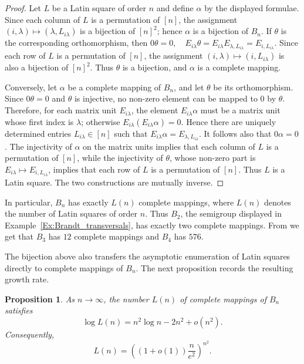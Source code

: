 \documentclass[11pt]{article}
\theoremstyle{plain}
\newtheorem{prop}[theorem]{Proposition}
\theoremstyle{remark}
\theoremstyle{definition}
\theoremstyle{plain}
\begin{document}
\begin{proof}
Let $L$ be a Latin square of order $n$ and define $\alpha$ by the displayed
formulae. Since each column of $L$ is a permutation of $[n]$, the assignment
$(i,\lambda)\mapsto (\lambda,L_{i\lambda})$ is a bijection of $[n]^2$; hence
$\alpha$ is a bijection of $B_n$. If $\theta$ is the corresponding
orthomorphism, then
\(0\theta=0, \quad E_{i\lambda}\theta =E_{i\lambda}E_{\lambda,L_{i\lambda}} =E_{i,L_{i\lambda}}.\)
Since each row of $L$ is a permutation of $[n]$, the assignment
$(i,\lambda)\mapsto (i,L_{i\lambda})$ is also a bijection of $[n]^2$. Thus
$\theta$ is a bijection, and $\alpha$ is a complete mapping.

Conversely, let $\alpha$ be a complete mapping of $B_n$, and let $\theta$ be its
orthomorphism. Since $0\theta=0$ and $\theta$ is injective, no non-zero element
can be mapped to $0$ by $\theta$. Therefore, for each matrix unit
$E_{i\lambda}$, the element $E_{i\lambda}\alpha$ must be a matrix unit whose
first index is $\lambda$; otherwise
$E_{i\lambda}(E_{i\lambda}\alpha)=0$. Hence there are uniquely determined
entries $L_{i\lambda}\in[n]$ such that
\(E_{i\lambda}\alpha=E_{\lambda,L_{i\lambda}}.\)
It follows also that $0\alpha=0$. The injectivity of $\alpha$ on the matrix
units implies that each column of $L$ is a permutation of $[n]$, while the
injectivity of $\theta$, whose non-zero part is
$E_{i\lambda}\mapsto E_{i,L_{i\lambda}}$, implies that each row of $L$ is a
permutation of $[n]$. Thus $L$ is a Latin square. The two constructions are
mutually inverse.
\end{proof}

In particular, $B_n$ has exactly $L(n)$ complete mappings, where $L(n)$ denotes
the number of Latin squares of order $n$. Thus $B_2$, the semigroup displayed in
Example~\ref{Ex:Brandt_transversals}, has exactly two complete mappings. From \cite{McKayWanless} we get that 
$B_3$ has $12$ complete mappings and $B_4$ has $576$.


The bijection above also transfers the asymptotic enumeration of Latin squares directly to complete mappings of $B_n$. The next proposition records the resulting growth rate.
\begin{prop}\label{p:brandt-latin-asymptotic}
As $n\to\infty$, the number $L(n)$ of complete mappings of $B_n$ satisfies
\[
        \log L(n)=n^2\log n-2n^2+o(n^2).
\]
Consequently,
\[
        L(n)=\left((1+o(1))\frac{n}{e^2}\right)^{n^2}.
\]
\end{prop}
\end{document}
